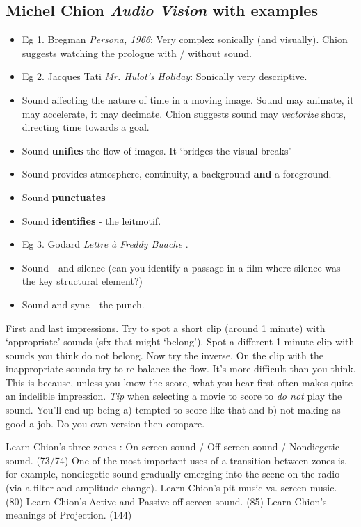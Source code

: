 \subsection{Michel Chion \textit{Audio Vision} with examples}
\begin{itemize}
\item Eg 1. Bregman \textit{Persona, 1966}: Very complex sonically (and visually). Chion suggests watching the prologue with / without sound. 
\item Eg 2. Jacques Tati \textit{Mr. Hulot's Holiday}: Sonically very descriptive. 
\item Sound affecting the nature of time in a moving image. Sound may animate, it may accelerate, it may decimate. Chion suggests sound may \textit{vectorize} shots, directing time towards a goal.
\item Sound \textbf{unifies} the flow of images. It `bridges the visual breaks' \citep[p.47]{chion1990} 
\item Sound provides atmosphere, continuity, a background \textbf{and} a foreground. 
\item Sound \textbf{punctuates}
\item Sound \textbf{identifies} - the leitmotif.
\item Eg 3. Godard \textit{Lettre \`a Freddy Buache} \citep[p.56]{chion1990}. 
\item Sound - and silence (can you identify a passage in a film where silence was the key structural element?)
\item Sound and sync - the punch. 
\end{itemize}

First and last impressions. Try to spot a short clip (around 1 minute) with `appropriate' sounds (sfx that might `belong'). Spot a different 1 minute clip with sounds you think do not belong. Now try the inverse. On the clip with the inappropriate sounds try to re-balance the flow. It's more difficult than you think. This is because, unless you know the score, what you hear first often makes quite an indelible impression. \textit{Tip} when selecting a movie to score to \textit{do not} play the sound. You'll end up being a) tempted to score like that and b) not making as good a job. Do you own version then compare. 

Learn Chion's three zones \citep[p.73]{chion1990}: On-screen sound / Off-screen sound / Nondiegetic sound. (73/74)
One of the most important uses of a transition between zones is, for example, nondiegetic sound gradually emerging into the scene on the radio (via a filter and amplitude change). 
Learn Chion's pit music vs. screen music. (80)
Learn Chion's Active and Passive off-screen sound. (85) 
Learn Chion's meanings of Projection. (144) 

